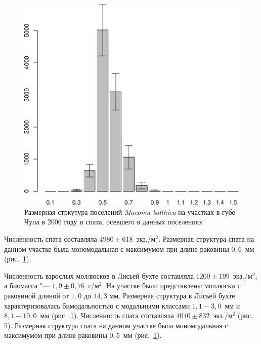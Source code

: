 \begin{figure}
\begin{minipage}[b]{.46\linewidth}
\begin{center}
	\end{center}
	\end{minipage}
%
	\hfil %
%
	\begin{minipage}[b]{.46\linewidth}
	\begin{center}	
		\includegraphics[width=0.21\textheight]{../White_Sea/spat/spat_str_Podpahta_1.pdf}
	\end{center}
	\end{minipage}
		\caption{Размерная стркутура поселений {\it Macoma balthica} на участках в губе Чупа в 2006 году и спата, осевшего в данных поселениях}
		\label{ris:Chupa_spat_sizestr}
	\end{figure}
Численность спата составляла $4980 \pm 618$~экз./м$^2$. 
Размерная структура спата на данном участке была мономодальная с максимумом при длине раковины $0,6$~мм (рис.~\ref{ris:Chupa_spat_sizestr}).

Численность взрослых моллюсков в Лисьей бухте составляла $1200 \pm 199$~экз./м$^2$, а биомасса "--- $1,9 \pm 0,76$~г/м$^2$. 
На участке были представлены моллюски с раковиной длиной от $1,0$ до $14,3$ мм. 
Размерная структура в Лисьей бухте характеризовалась бимодальностью с модальными классами $1,1 - 3,0$~мм и $8,1 - 10,0$~мм (рис.~\ref{ris:Chupa_spat_sizestr}). 
Численность спата составляла $4040 \pm 832$~экз./м$^2$ (рис. 5). 
Размерная структура спата на данном участке была мономодальная с максимумом при длине раковины $0,5$~мм (рис.~\ref{ris:Chupa_spat_sizestr}).

